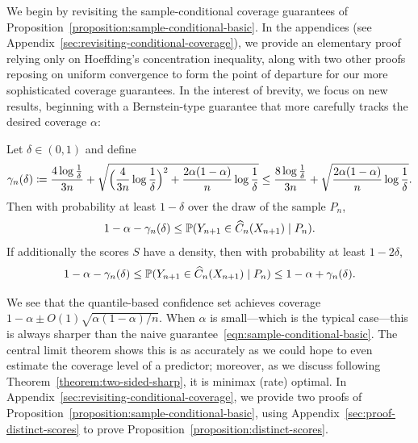 \documentclass{article}
\newcommand{\scorerv}{S}
\begin{document}
We begin by revisiting the sample-conditional coverage
guarantees of Proposition~\ref{proposition:sample-conditional-basic}.
%
In the appendices (see Appendix~\ref{sec:revisiting-conditional-coverage}),
we provide an elementary proof relying only on Hoeffding's
concentration inequality, along with two other proofs
reposing on uniform convergence to form the point of
departure for our more sophisticated coverage guarantees.
%
In the interest of brevity,
we focus on new results, beginning with
a Bernstein-type guarantee that more carefully tracks the desired
coverage $\alpha$:
\begin{proposition}
  \label{proposition:distinct-scores}
  Let $\delta \in (0, 1)$ and define
  \begin{equation*}
    \gamma_n(\delta) \coloneqq \frac{4 \log \frac{1}{\delta}}{3n}
    + \sqrt{\Big(\frac{4}{3 n} \log \frac{1}{\delta}\Big)^2 +
      \frac{2 \alpha(1 - \alpha)}{n}
      \log \frac{1}{\delta}}
    \le \frac{8 \log \frac{1}{\delta}}{3n}
    + \sqrt{\frac{2 \alpha(1 - \alpha)}{n} \log \frac{1}{\delta}}.
  \end{equation*}
  Then with probability at least $1 - \delta$
  over the draw of the sample $P_n$,
  \begin{equation*}
    1 - \alpha - \gamma_n(\delta)
    \le \mathbb{P}(Y_{n + 1} \in \widehat{C}_n(X_{n+1}) \mid P_n).
  \end{equation*}
  If additionally the scores $\scorerv$ have a density,
  then with probability at least $1 - 2 \delta$,
  \begin{equation*}
    1 - \alpha - \gamma_n(\delta)
    \le \mathbb{P}(Y_{n + 1} \in \widehat{C}_n(X_{n+1}) \mid P_n)
    \le 1 - \alpha + \gamma_n(\delta).
  \end{equation*}
\end{proposition}

We see that the quantile-based confidence set achieves
coverage $1 - \alpha \pm O(1) \sqrt{\alpha(1 - \alpha) / n}$.
%
When $\alpha$ is small---which is the typical case---this is
always sharper than the naive guarantee~\eqref{eqn:sample-conditional-basic}.
%
The central limit theorem shows this is as accurately as we could hope to
even estimate the coverage level of a predictor; moreover, as we discuss
following Theorem~\ref{theorem:two-sided-sharp}, it is minimax
(rate) optimal.
%
In Appendix~\ref{sec:revisiting-conditional-coverage}, we provide two proofs
of Proposition~\ref{proposition:sample-conditional-basic}, using
Appendix~\ref{sec:proof-distinct-scores} to prove
Proposition~\ref{proposition:distinct-scores}.
\end{document}
